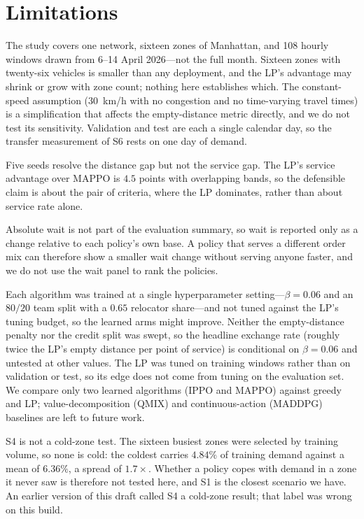\documentclass[conference]{IEEEtran}
\begin{document}
\section{Limitations}
\label{sec:limitations}

The study covers one network, sixteen zones of Manhattan, and 108 hourly
windows drawn from 6--14 April 2026---not the full month. Sixteen zones with
twenty-six vehicles is smaller than any deployment, and the LP's advantage may
shrink or grow with zone count; nothing here establishes which. The
constant-speed assumption (30~km/h with no congestion and no time-varying
travel times) is a simplification that affects the empty-distance metric
directly, and we do not test its sensitivity. Validation and test are each a
single calendar day, so the transfer measurement of S6 rests on one day of
demand.

Five seeds resolve the distance gap but not the service gap. The LP's service
advantage over MAPPO is $4.5$ points with overlapping bands, so the defensible
claim is about the pair of criteria, where the LP dominates, rather than about
service rate alone.

Absolute wait is not part of the evaluation summary, so wait is reported only
as a change relative to each policy's own base. A policy that serves a
different order mix can therefore show a smaller wait change without serving
anyone faster, and we do not use the wait panel to rank the policies.

Each algorithm was trained at a single hyperparameter setting---$\beta=0.06$
and an $80/20$ team split with a $0.65$ relocator share---and not tuned
against the LP's tuning budget, so the learned arms might improve. Neither the
empty-distance penalty nor the credit split was swept, so the headline
exchange rate (roughly twice the LP's empty distance per point of service) is
conditional on $\beta=0.06$ and untested at other values. The LP was tuned on
training windows rather than on validation or test, so its edge does not come
from tuning on the evaluation set. We compare only two learned algorithms
(IPPO and MAPPO) against greedy and LP; value-decomposition (QMIX) and
continuous-action (MADDPG) baselines are left to future work.

S4 is not a cold-zone test. The sixteen busiest zones were selected by
training volume, so none is cold: the coldest carries $4.84\%$ of training
demand against a mean of $6.36\%$, a spread of $1.7\times$. Whether a policy
copes with demand in a zone it never saw is therefore not tested here, and S1
is the closest scenario we have. An earlier version of this draft called S4 a
cold-zone result; that label was wrong on this build.
\end{document}
